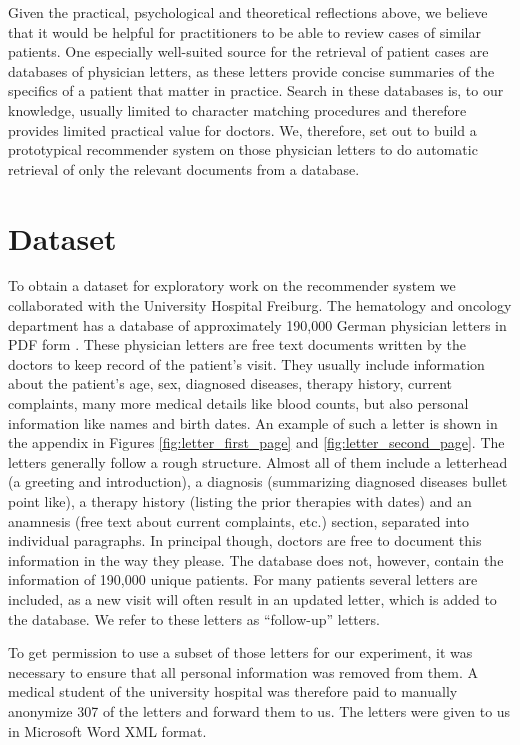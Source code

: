 Given the practical, psychological and theoretical reflections above, we believe that it would be helpful for practitioners to be able to review cases of similar patients. One especially well-suited source for the retrieval of patient cases are databases of physician letters, as these letters provide concise summaries of the specifics of a patient that matter in practice. Search in these databases is, to our knowledge, usually limited to character matching procedures and therefore provides limited practical value for doctors. We, therefore, set out to build a prototypical recommender system on those physician letters to do automatic retrieval of only the relevant documents from a database.


\section{Dataset}

To obtain a dataset for exploratory work on the recommender system we collaborated with the University Hospital Freiburg. The hematology and oncology department has a database of approximately 190,000 German
physician letters in PDF form \citep{spadaro2012}. These physician letters are free text documents
written by the doctors to keep record of the patient's visit. They
usually include information about the patient's age, sex, diagnosed
diseases, therapy history, current complaints, many more medical details
like blood counts, but also personal information like names and birth dates. An example of such a letter is shown in the appendix in Figures \ref{fig:letter_first_page} and \ref{fig:letter_second_page}.
The letters generally follow a rough structure. Almost all of them include a letterhead (a greeting and introduction), a diagnosis (summarizing diagnosed diseases bullet point like), a therapy history (listing the prior therapies with dates) and an anamnesis (free text about current complaints, etc.) section, separated into individual paragraphs. In principal though, doctors are free to document this information in the way they please. The database does not, however, contain the information of 190,000 unique patients. For many patients several letters are included, as a new visit will often result in an updated letter, which is added to the database. We refer to these letters as ``follow-up'' letters.

To get permission to use a subset of those letters for our experiment, it was necessary to ensure that all personal information was removed from them. A medical student of the university hospital was therefore paid to manually anonymize 307 of the letters and forward them to us. The letters were given to us in Microsoft Word XML format.

